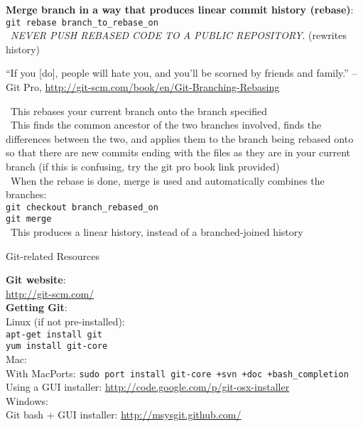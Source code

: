 \documentclass[12pt]{article}
\begin{document}
{{\bf Merge branch in a way that produces linear commit history (rebase)}:\\
\texttt{git rebase branch{\_}to{\_}rebase{\_}on}\\
\textbullet\, \emph{NEVER PUSH REBASED CODE TO A PUBLIC REPOSITORY}. (rewrites history)
\begin{quoting}[vskip=0pt]
``If you [do], people will hate you, and you’ll be scorned by friends and family.'' --Git Pro, \url{http://git-scm.com/book/en/Git-Branching-Rebasing}
\end{quoting}
\textbullet\, This rebases your current branch onto the branch specified\\
\textbullet\, This finds the common ancestor of the two branches involved, finds the differences between the two, and applies them to the branch being rebased onto so that there are new commits ending with the files as they are in your current branch (if this is confusing, try the git pro book link provided)\\
\textbullet\, When the rebase is done, merge is used and automatically combines the branches:\\
\hspace*{6mm}\texttt{git checkout branch{\_}rebased{\_}on}\\
\hspace*{6mm}\texttt{git merge}\\
\textbullet\, This produces a linear history, instead of a branched-joined history\\
\vspace{5mm}

\begin{center}
{\large Git-related Resources}
\end{center}
{\bf Git website}:\\
\url{http://git-scm.com/}\\

{\bf Getting Git}:\\
Linux (if not pre-installed):\\
\texttt{apt-get install git}\\
\texttt{yum install git-core}\\

Mac:\\
With MacPorts: \texttt{sudo port install git-core +svn +doc +bash{\_}completion}\\
Using a GUI installer: \url{http://code.google.com/p/git-osx-installer}\\

Windows:\\
Git bash + GUI installer: \url{http://msysgit.github.com/}\\

}
\end{document}
